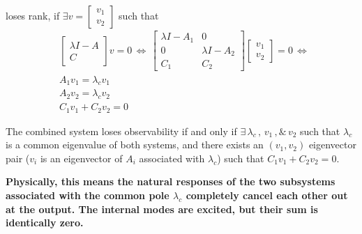 \documentclass[twoside]{article}
\begin{document}
loses rank, if $\exists v = \begin{bmatrix} v_1 \\ v_2 \end{bmatrix}$ such that 
%
%
\begin{align*}
	&\left[ \begin{array}{c} \lambda I - A \\ \hline C \end{array} \right] v  = 0 
	\, \iff \,  \left[ \begin{array}{c|c} \lambda I - A_1 & 0 \\ \hline 0 &  \lambda I - A_2 \\ \hline  C_1 & C_2 \end{array} \right] \begin{bmatrix} v_1 \\ v_2 \end{bmatrix} = 0
	\, \iff \, 
	\\
	& A_1 v_1 = \lambda_c v_1 \\
	& A_2 v_2 = \lambda_c v_2 \\
	& C_1 v_1 + C_2 v_2 = 0
\end{align*}
%
\begin{tcolorbox}[takeawaybox, title=Key Takeaway: Observability in Parallel]
The combined system loses observability if and only if $\exists \, \lambda_c  \, , \, v_1 \, ,\& \, v_2$ such that 
$\lambda_c$ is a common eigenvalue of both systems, and there exists an $(v_1,v_2)$ eigenvector pair ($v_i$ is an eigenvector of $A_i$ associated with $\lambda_c$)
such that $C_1 v_1 + C_2 v_2 = 0$. 

\vspace{2mm}
\textbf{Physically, this means the natural responses of the two subsystems associated with the common pole $\lambda_c$ completely cancel each other out at the output. The internal modes are excited, but their sum is identically zero.}
\end{tcolorbox}
\end{document}
